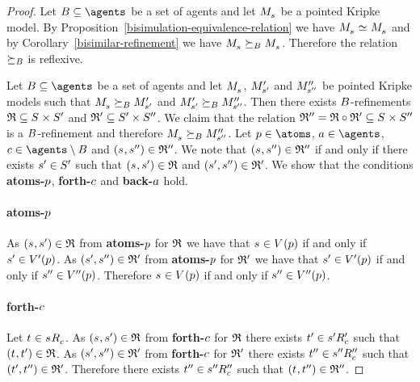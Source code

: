 \begin{proof}
Let $\agentsB \subseteq \agents$ be a set of agents and let $\kPModel{\kStateS}$ be a pointed Kripke model.
By Proposition~\ref{bisimulation-equivalence-relation} we have $\kPModel{\kStateS} \bisimilar \kPModel{\kStateS}$ and by Corollary~\ref{bisimilar-refinement} we have $\kPModel{\kStateS} \simulatesBs \kPModel{\kStateS}$.
Therefore the relation $\succeq_{B}$ is reflexive.

Let $\agentsB \subseteq \agents$ be a set of agents and let $\kPModel{\kStateS}$, ${M^{\prime}_{{s}^{\prime}}}$ and ${M^{\prime\prime}_{{s}^{\prime\prime}}}$ be pointed Kripke models such that $\kPModel{\kStateS} \simulatesBs \kPModelP{\kStateSP}$ and ${M^{\prime}_{{s}^{\prime}}} \succeq_{B} {M^{\prime\prime}_{{s}^{\prime\prime}}}$.
Then there exists $B$-refinements $\refinement \subseteq \kStates \times \kStatesP$ and $\mathfrak{R}' \subseteq {S^{\prime}} \times {S^{\prime\prime}}$.
We claim that the relation $\refinement'' = \refinement \circ \refinement' \subseteq \kStates \times \kStatesPP$ is a $B$-refinement and therefore $\kPModel{\kStateS} \simulatesBs \kPModelPP{\kStateSPP}$.
Let $\atomP \in \atoms$, $\agentA \in \agents$, $\agentC \in \agents \setminus \agentsB$ and $(\kStateS, \kStateSPP) \in \refinement''$.
We note that $(\kStateS, \kStateSPP) \in \refinement''$ if and only if there exists ${s}^{\prime} \in {S^{\prime}}$ such that $(\kStateS, \kStateSP) \in \refinement$ and $({s}^{\prime}, {s}^{\prime\prime}) \in \mathfrak{R}'$.
We show that the conditions {\bf atoms-$p$}, {\bf forth-$c$} and {\bf back-$a$} hold.

\paragraph{atoms-$p$}
As $(\kStateS, \kStateSP) \in \refinement$ from {\bf atoms-$p$} for $\mathfrak{R}$ we have that $\kStateS \in \kValuation(\atomP)$ if and only if ${s}^{\prime} \in {V^{\prime}}(p)$.
As $({s}^{\prime}, {s}^{\prime\prime}) \in \mathfrak{R}'$ from {\bf atoms-$p$} for $\mathfrak{R}'$ we have that ${s}^{\prime} \in {V^{\prime}}(p)$ if and only if ${s}^{\prime\prime} \in {V^{\prime\prime}}(p)$.
Therefore $\kStateS \in \kValuation(\atomP)$ if and only if ${s}^{\prime\prime} \in {V^{\prime\prime}}(p)$.

\paragraph{forth-$c$}
Let $\kStateT \in \kSuccessorsC{\kStateS}$.
As $(\kStateS, \kStateSP) \in \refinement$ from {\bf forth-$c$} for $\mathfrak{R}$ there exists ${t}^{\prime} \in {{s}^{\prime}} {R^{\prime}_{c}}$ such that $(\kStateT, \kStateTP) \in \refinement$.
As $({s}^{\prime}, {s}^{\prime\prime}) \in \mathfrak{R}'$ from {\bf forth-$c$} for $\mathfrak{R}'$ there exists ${t}^{\prime\prime} \in {{s}^{\prime\prime}} {R^{\prime\prime}_{c}}$ such that $({t}^{\prime}, {t}^{\prime\prime}) \in \mathfrak{R}'$.
Therefore there exists ${t}^{\prime\prime} \in {{s}^{\prime\prime}} {R^{\prime\prime}_{c}}$ such that $(\kStateT, \kStateTPP) \in \refinement''$.


\end{proof}
